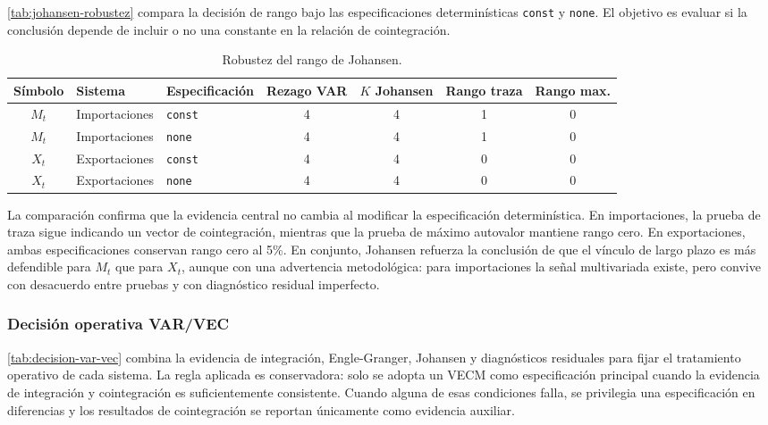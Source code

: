\documentclass[11pt,a4paper]{article}
\begin{document}
	\autoref{tab:johansen-robustez} compara la decisión de rango bajo las
	especificaciones determinísticas \texttt{const} y \texttt{none}. El objetivo
	es evaluar si la conclusión depende de incluir o no una constante en la
	relación de cointegración.
	
	\begin{table}[H]
		\centering
		\caption{Robustez del rango de Johansen.}
		\label{tab:johansen-robustez}
		\small
		\begin{tabular}{cllcccc}
			\toprule
			Símbolo & Sistema & Especificación & Rezago VAR & \(K\) Johansen & Rango traza & Rango max. \\
			\midrule
			\(M_t\) & Importaciones & \texttt{const} & 4 & 4 & 1 & 0 \\
			\(M_t\) & Importaciones & \texttt{none} & 4 & 4 & 1 & 0 \\
			\(X_t\) & Exportaciones & \texttt{const} & 4 & 4 & 0 & 0 \\
			\(X_t\) & Exportaciones & \texttt{none} & 4 & 4 & 0 & 0 \\
			\bottomrule
		\end{tabular}
	\end{table}
	
	La comparación confirma que la evidencia central no cambia al modificar la
	especificación determinística. En importaciones, la prueba de traza sigue
	indicando un vector de cointegración, mientras que la prueba de máximo autovalor
	mantiene rango cero. En exportaciones, ambas especificaciones conservan rango
	cero al 5\%. En conjunto, Johansen refuerza la conclusión de que el vínculo de
	largo plazo es más defendible para \(M_t\) que para \(X_t\), aunque con una
	advertencia metodológica: para importaciones la señal multivariada existe, pero
	convive con desacuerdo entre pruebas y con diagnóstico residual imperfecto.
	
	\subsubsection{Decisión operativa VAR/VEC}
	\label{subsubsec:decision-var-vec}
	
	\autoref{tab:decision-var-vec} combina la evidencia de integración,
	Engle-Granger, Johansen y diagnósticos residuales para fijar el tratamiento
	operativo de cada sistema. La regla aplicada es conservadora: solo se adopta un
	VECM como especificación principal cuando la evidencia de integración y
	cointegración es suficientemente consistente. Cuando alguna de esas condiciones
	falla, se privilegia una especificación en diferencias y los resultados de
	cointegración se reportan únicamente como evidencia auxiliar.
	
\end{document}
